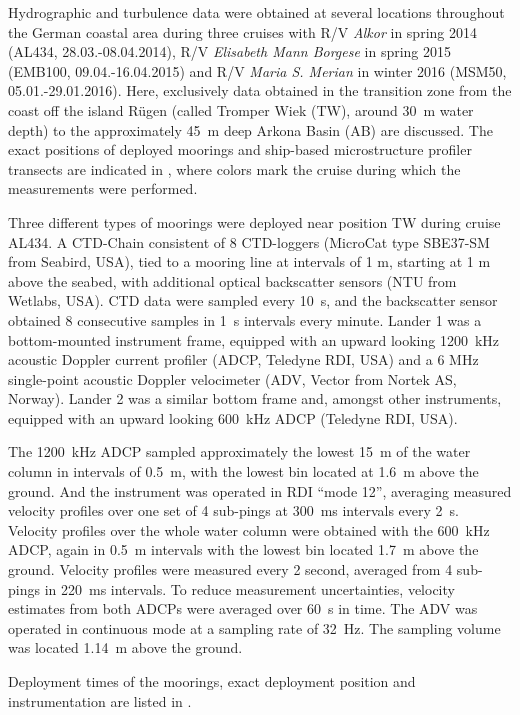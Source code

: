 Hydrographic and turbulence data were obtained at several locations throughout 
the 
German coastal area during three cruises with R/V \textit{Alkor} in spring 2014 
(AL434, 28.03.-08.04.2014), R/V \textit{Elisabeth Mann Borgese} in spring 2015 
(EMB100, 09.04.-16.04.2015) and R/V \textit{Maria S. Merian} in winter 2016 
(MSM50, 05.01.-29.01.2016). Here, exclusively data obtained in the 
transition zone from the coast off 
the island R\"{u}gen (called Tromper Wiek (TW), around 30~m water depth) to 
the approximately 45~m deep Arkona Basin (AB) are discussed. The exact 
positions of deployed 
moorings and ship-based microstructure profiler transects are indicated in 
, where colors mark the cruise during which the measurements 
were performed.

Three different types of moorings were deployed near position TW during cruise 
AL434. A CTD-Chain consistent of 8 CTD-loggers (MicroCat type SBE37-SM from 
Seabird, USA), tied to a mooring line at intervals of 1 m, starting at 1 m above 
the seabed, with additional optical backscatter sensors (NTU from Wetlabs, USA). 
CTD data were sampled every 10~s, and the backscatter sensor obtained 8 
consecutive samples in 1~s intervals every minute.
Lander 1 was a bottom-mounted instrument frame, equipped with an upward looking 
1200~kHz acoustic Doppler current profiler (ADCP, Teledyne RDI, USA) and a 6 
MHz single-point acoustic Doppler velocimeter (ADV, Vector from Nortek AS, 
Norway).
Lander 2 was a similar bottom frame and, amongst other instruments, equipped 
with an upward looking 600~kHz ADCP (Teledyne RDI, USA).

The 1200~kHz ADCP sampled approximately the lowest 15~m of the water column in 
intervals of 0.5~m, with the lowest bin located at 1.6~m above the ground. 
And the instrument was operated in RDI ``mode 12'', 
averaging measured velocity profiles over one set of 4 sub-pings at 300~ms 
intervals every 2~s. 
Velocity profiles over the whole water column were 
obtained with the 600~kHz ADCP, again in 0.5~m intervals with the lowest bin 
located 1.7~m above the ground. Velocity profiles were measured every 2 second, 
averaged from 4 sub-pings in 220~ms intervals. To reduce measurement 
uncertainties, velocity estimates from both ADCPs were averaged over 60~s in 
time. 
The ADV was operated in continuous mode at a sampling rate of 32~Hz. The 
sampling volume was located 1.14~m above the ground.

Deployment times of the moorings, exact deployment position and instrumentation 
are listed in .

